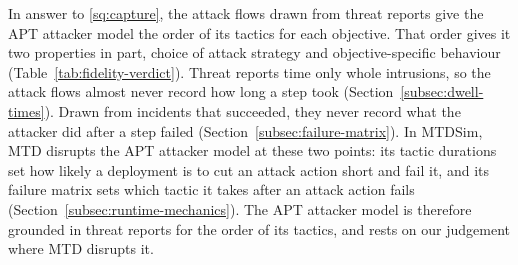 \documentclass{cshonours}
\begin{document}
In answer to \ref{sq:capture}, the attack flows drawn from threat reports
give the APT attacker model the order of its tactics for each objective. That
order gives it two properties in part, choice of attack strategy and
objective-specific behaviour (Table~\ref{tab:fidelity-verdict}). Threat reports time only
whole intrusions, so the attack flows almost never record how long a step took
(Section~\ref{subsec:dwell-times}). Drawn from incidents that succeeded, they
never record what the attacker did after a step failed
(Section~\ref{subsec:failure-matrix}). In MTDSim, MTD disrupts the APT
attacker model at these two points: its tactic durations set how likely a
deployment is to cut an attack action short and fail it, and its failure
matrix sets which tactic it takes after an attack action fails
(Section~\ref{subsec:runtime-mechanics}). The APT attacker model is therefore
grounded in threat reports for the order of its tactics, and rests on our
judgement where MTD disrupts it.
\end{document}
